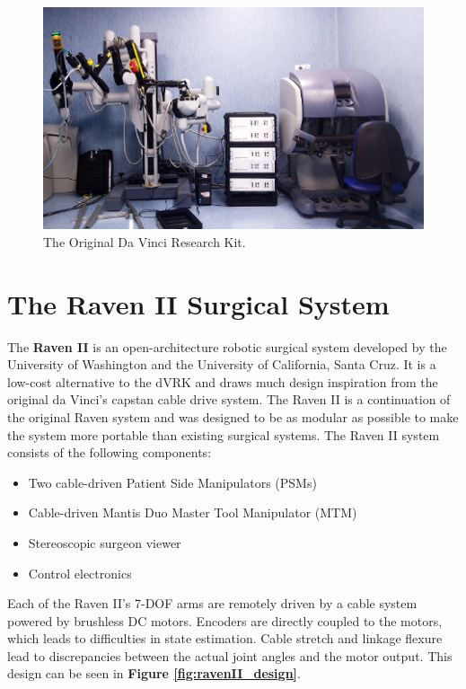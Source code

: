 \begin{figure}[H]
    \centering
    \includegraphics[width=0.75\linewidth]{figures/DVRK.png}
    \caption{The Original Da Vinci Research Kit. \cite{Fontanelli2017ModellingAI}}
    \label{fig:DVRK}
\end{figure}



\section{The Raven II Surgical System}

The \textbf{Raven II} is an open-architecture robotic surgical system developed by the University of Washington and the University of California, Santa Cruz. It is a low-cost alternative to the dVRK and draws much design inspiration from the original da Vinci's capstan cable drive system. The Raven II is a continuation of the original Raven system and was designed to be as modular as possible to make the system more portable than existing surgical systems. The Raven II system consists of the following components:

\begin{itemize}
    \item Two cable-driven Patient Side Manipulators (PSMs)
    \item Cable-driven Mantis Duo Master Tool Manipulator (MTM)
    \item Stereoscopic surgeon viewer
    \item Control electronics
\end{itemize}

Each of the Raven II's 7-DOF arms are remotely driven by a cable system powered by brushless DC motors. Encoders are directly coupled to the motors, which leads to difficulties in state estimation. Cable stretch and linkage flexure lead to discrepancies between the actual joint angles and the motor output. This design can be seen in \textbf{Figure \ref{fig:ravenII_design}}.

